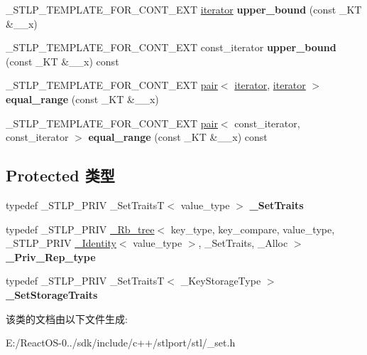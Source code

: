 \begin{DoxyCompactItemize}
\mbox{\label{classset_a21fd087f263489ec80dc33479b330bea}} 
\+\_\+\+S\+T\+L\+P\+\_\+\+T\+E\+M\+P\+L\+A\+T\+E\+\_\+\+F\+O\+R\+\_\+\+C\+O\+N\+T\+\_\+\+E\+XT \hyperlink{structiterator}{iterator} {\bfseries upper\+\_\+bound} (const \+\_\+\+KT \&\+\_\+\+\_\+x)
\item 
\mbox{\label{classset_aed967f4c4ba2b9f33115b6756ca21af3}} 
\+\_\+\+S\+T\+L\+P\+\_\+\+T\+E\+M\+P\+L\+A\+T\+E\+\_\+\+F\+O\+R\+\_\+\+C\+O\+N\+T\+\_\+\+E\+XT const\+\_\+iterator {\bfseries upper\+\_\+bound} (const \+\_\+\+KT \&\+\_\+\+\_\+x) const
\item 
\mbox{\label{classset_a63fbeadadc1edd7ff9fc68757bf8569e}} 
\+\_\+\+S\+T\+L\+P\+\_\+\+T\+E\+M\+P\+L\+A\+T\+E\+\_\+\+F\+O\+R\+\_\+\+C\+O\+N\+T\+\_\+\+E\+XT \hyperlink{structpair}{pair}$<$ \hyperlink{structiterator}{iterator}, \hyperlink{structiterator}{iterator} $>$ {\bfseries equal\+\_\+range} (const \+\_\+\+KT \&\+\_\+\+\_\+x)
\item 
\mbox{\label{classset_a1aee49950b07f6ca41c15621d9733352}} 
\+\_\+\+S\+T\+L\+P\+\_\+\+T\+E\+M\+P\+L\+A\+T\+E\+\_\+\+F\+O\+R\+\_\+\+C\+O\+N\+T\+\_\+\+E\+XT \hyperlink{structpair}{pair}$<$ const\+\_\+iterator, const\+\_\+iterator $>$ {\bfseries equal\+\_\+range} (const \+\_\+\+KT \&\+\_\+\+\_\+x) const
\end{DoxyCompactItemize}
\subsection*{Protected 类型}
\begin{DoxyCompactItemize}
\item 
\mbox{\label{classset_a7c2b7ef83e911b73bebc842221a7a4b4}} 
typedef \+\_\+\+S\+T\+L\+P\+\_\+\+P\+R\+IV \+\_\+\+Set\+TraitsT$<$ value\+\_\+type $>$ {\bfseries \+\_\+\+Set\+Traits}
\item 
\mbox{\label{classset_ab6a8cfe9f015eb2edd40d8a85c1c36b2}} 
typedef \+\_\+\+S\+T\+L\+P\+\_\+\+P\+R\+IV \hyperlink{class___rb__tree}{\+\_\+\+Rb\+\_\+tree}$<$ key\+\_\+type, key\+\_\+compare, value\+\_\+type, \+\_\+\+S\+T\+L\+P\+\_\+\+P\+R\+IV \hyperlink{struct___identity}{\+\_\+\+Identity}$<$ value\+\_\+type $>$, \+\_\+\+Set\+Traits, \+\_\+\+Alloc $>$ {\bfseries \+\_\+\+Priv\+\_\+\+Rep\+\_\+type}
\item 
\mbox{\label{classset_a6709cebdfa13ace0aea9664f29b2d819}} 
typedef \+\_\+\+S\+T\+L\+P\+\_\+\+P\+R\+IV \+\_\+\+Set\+TraitsT$<$ \+\_\+\+Key\+Storage\+Type $>$ {\bfseries \+\_\+\+Set\+Storage\+Traits}
\end{DoxyCompactItemize}


该类的文档由以下文件生成\+:\begin{DoxyCompactItemize}
\item 
E\+:/\+React\+O\+S-\/0../sdk/include/c++/stlport/stl/\+\_\+set.\+h\end{DoxyCompactItemize}
